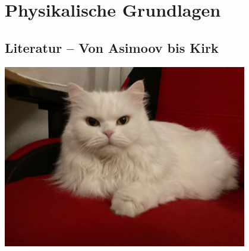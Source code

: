 \chapter{Physikalische Grundlagen}

\section{Literatur -- Von Asimoov bis Kirk}

\blindtext[3]

\begin{center}
\includegraphics[width=0.8\textwidth]{Bilder/Katze.jpg}
\label{fig:katze}
\end{center}


\blindtext[3]

